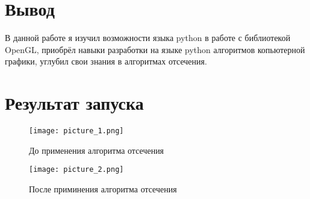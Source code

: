 \documentclass[a4paper, 14pt]{extarticle}
\begin{document}
\section{Вывод}

В данной работе я изучил возможности языка python в работе с библиотекой OpenGL, приобрёл навыки разработки на языке python алгоритмов копьютерной графики, углубил свои знания в алгоритмах отсечения. 


\section{Результат запуска}
    
\begin{figure}[!htb]
	\centering
	\texttt{[image: picture\_1.png]}
\caption{До применения алгоритма отсечения}
\label{fig:picture_1.png}
\end{figure}

\begin{figure}[!htb]
	\centering
	\texttt{[image: picture\_2.png]}
\caption{После приминения алгоритма отсечения}
\label{fig:picture_2.png}
\end{figure}
\end{document}
